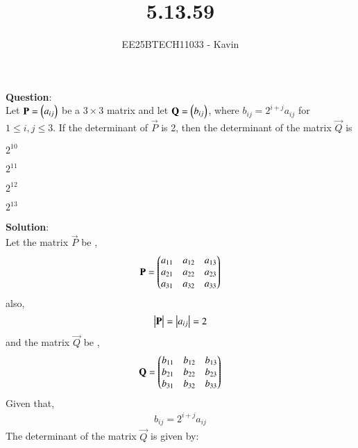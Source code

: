 \documentclass[journal]{IEEEtran}
\begin{document}

\vspace{3cm}

\title{5.13.59}
\author{EE25BTECH11033 - Kavin}
{\let\newpage\relax\maketitle}

\renewcommand{\thefigure}{\theenumi}
\renewcommand{\thetable}{\theenumi}
\setlength{\intextsep}{10pt} %
\textbf{Question}:\\
 Let $\mathbf{P} = \begin{pmatrix}a_{ij}\end{pmatrix}$ be a $3 \times 3$ matrix and let $\mathbf{Q} =  \begin{pmatrix}b_{ij}\end{pmatrix}$, where $b_{ij} = 2^{i+j}a_{ij}$ for $1 \le i,j \le 3$. If the determinant of $\vec{P}$ is 2, then the determinant of the matrix $\vec{Q}$ is 
\begin{enumerate}
\begin{multicols}{4}
\item $2^{10}$ \columnbreak
\item $2^{11}$ \columnbreak
\item $2^{12}$\columnbreak
\item $2^{13}$
\end{multicols}
\end{enumerate}
\bigskip

\textbf{Solution}:\\
Let the matrix $\vec{P}$ be ,
\begin{align}
    \mathbf{P} = \begin{pmatrix}a_{11} & a_{12} & a_{13}\\a_{21} & a_{22} & a_{23}\\a_{31} & a_{32} & a_{33}\end{pmatrix}
\end{align}
also,
\begin{align}
    \begin{vmatrix}\mathbf{P}\end{vmatrix} = \begin{vmatrix}a_{ij}\end{vmatrix} = 2
\end{align}
and the matrix $\vec{Q}$ be ,
\begin{align}
    \mathbf{Q} = \begin{pmatrix}b_{11} & b_{12} & b_{13}\\b_{21} & b_{22} & b_{23}\\b_{31} & b_{32} & b_{33}\end{pmatrix}
\end{align}
Given that,
\begin{align}
    b_{ij} = 2^{i+j}a_{ij}
\end{align}
The determinant of the matrix $\vec{Q}$ is given by:
\end{document}
